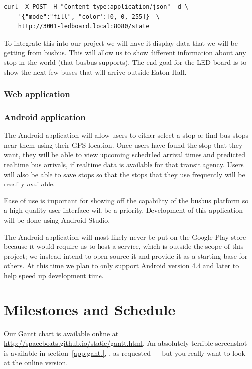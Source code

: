 \documentclass[12pt]{article}
\begin{document}
\begin{verbatim}
curl -X POST -H "Content-type:application/json" -d \
    '{"mode":"fill", "color":[0, 0, 255]}' \
    http://3001-ledboard.local:8080/state
\end{verbatim}

To integrate this into our project
we will have it display data that we will be getting from busbus.  This will allow
us to show different information about any stop in the world (that
busbus supports). The end goal for the LED board is to show the next few buses that will arrive outside Eaton Hall.

\subsubsection{Web application}

\subsubsection{Android application}
The Android application will allow users to either select a stop or find bus stops near them using their GPS location.
Once users have found the stop that they want, they will be able to view upcoming scheduled arrival times and
predicted realtime bus arrivals, if realtime data is available for that transit agency. Users will also be able
to save stops so that the stops that they use frequently will be readily available.

Ease of use is important
for showing off the capability of the busbus platform so a high quality user interface will be a priority.
Development of this application will be done using Android Studio.

The Android application will most likely never
be put on the Google Play store because it would require us to host a service, which is outside the scope of this
project; we instead intend to open source it and provide it as a starting base for others.
At this time we plan to only support Android version 4.4 and later to help speed up development time.

\section{Milestones and Schedule}
Our Gantt chart is available online at \url{http://spaceboats.github.io/static/gantt.html}.
An absolutely terrible screenshot is available in section~\ref{app:gantt}, \textit{}, as requested --- but you really want to look at the online version.
\end{document}
